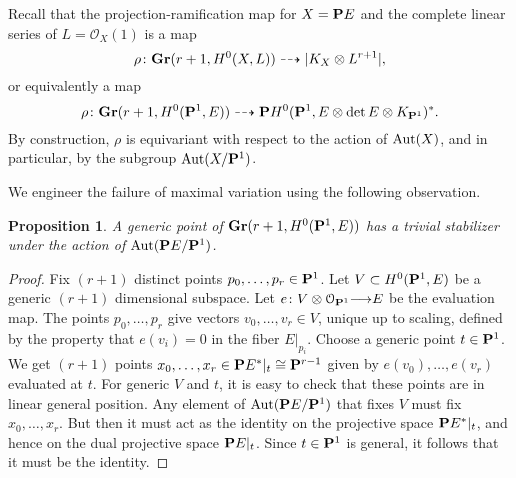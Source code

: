 \documentclass[11pt,reqno]{amsart}
\theoremstyle{plain}
\newtheorem{proposition}[theorem]{Proposition}
\theoremstyle{definition}
\theoremstyle{remark}
\numberwithin{equation}{section}
\renewcommand{\to}{{\longrightarrow}}
\numberwithin{equation}{section}
\renewcommand{\O}{\mathcal O}
\begin{document}
Recall that the projection-ramification map for $X = \P E$ and the complete linear series of $L = \O_X(1)$ is a map
\[ \rho \from \Gr(r+1, H^0(X, L)) \dashrightarrow |K_X \otimes L^{r+1}|,\]
or equivalently a map
\[ \rho \from \Gr(r+1, H^0(\P^1, E)) \dashrightarrow \P H^0(\P^1, E \otimes \det E \otimes K_{\P^1})^*.\]
By construction, $\rho$ is equivariant with respect to the action of $\Aut(X)$, and in particular, by the subgroup $\Aut(X/\P^1)$.

We engineer the failure of maximal variation using the following observation.
\begin{proposition}\label{prop:nogenstab}
  A generic point of $\Gr(r+1, H^0(\P^1, E))$ has a trivial stabilizer under the action of $\Aut(\P E/\P^1)$.
\end{proposition}
\begin{proof}
  Fix $(r+1)$ distinct points $p_0, \dots, p_r \in \P^1$.
  Let $V \subset H^0(\P^1, E)$ be a generic $(r+1)$ dimensional subspace.
  Let $e \from V \otimes \O_{\P^1} \to E$ be the evaluation map.
  The points $p_0, \dots, p_r$ give vectors $v_0, \dots, v_r \in V$, unique up to scaling, defined by the property that $e(v_i) = 0$ in the fiber $E|_{p_i}$.
  Choose a generic point $t \in \P^1$.
  We get $(r+1)$ points $x_0, \dots, x_r \in \P E^*|_{t} \cong \P^{r-1}$ given by $e(v_0), \dots, e(v_r)$ evaluated at $t$.
  For generic $V$ and $t$, it is easy to check that these points are in linear general position.
  Any element of $\Aut(\P E/\P^1)$ that fixes $V$ must fix $x_0, \dots, x_r$.
  But then it must act as the identity on the projective space $\P E^*|_t$, and hence on the dual projective space $\P E|_t$.
  Since $t \in \P^1$ is general, it follows that it must be the identity.
\end{proof}
\end{document}
